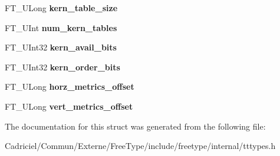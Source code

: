 \begin{DoxyCompactItemize}
\item 
\hypertarget{struct_t_t___face_rec___acfef0fabbe95af382fb0710edfe98887}{F\-T\-\_\-\-U\-Long {\bfseries kern\-\_\-table\-\_\-size}}\label{struct_t_t___face_rec___acfef0fabbe95af382fb0710edfe98887}

\item 
\hypertarget{struct_t_t___face_rec___a9c5b27564d0c22e0ee6edd7b6dc675c0}{F\-T\-\_\-\-U\-Int {\bfseries num\-\_\-kern\-\_\-tables}}\label{struct_t_t___face_rec___a9c5b27564d0c22e0ee6edd7b6dc675c0}

\item 
\hypertarget{struct_t_t___face_rec___a5f97232ee6773a57ef8734555cc960e1}{F\-T\-\_\-\-U\-Int32 {\bfseries kern\-\_\-avail\-\_\-bits}}\label{struct_t_t___face_rec___a5f97232ee6773a57ef8734555cc960e1}

\item 
\hypertarget{struct_t_t___face_rec___a810b4e002ebbdfcb44005cb69b09a917}{F\-T\-\_\-\-U\-Int32 {\bfseries kern\-\_\-order\-\_\-bits}}\label{struct_t_t___face_rec___a810b4e002ebbdfcb44005cb69b09a917}

\item 
\hypertarget{struct_t_t___face_rec___a5ff62c77d90743e333ca8dfa7d382f22}{F\-T\-\_\-\-U\-Long {\bfseries horz\-\_\-metrics\-\_\-offset}}\label{struct_t_t___face_rec___a5ff62c77d90743e333ca8dfa7d382f22}

\item 
\hypertarget{struct_t_t___face_rec___a33baf2e26d533d82f06875361fd423d1}{F\-T\-\_\-\-U\-Long {\bfseries vert\-\_\-metrics\-\_\-offset}}\label{struct_t_t___face_rec___a33baf2e26d533d82f06875361fd423d1}

\end{DoxyCompactItemize}


The documentation for this struct was generated from the following file\-:\begin{DoxyCompactItemize}
\item 
Cadriciel/\-Commun/\-Externe/\-Free\-Type/include/freetype/internal/tttypes.\-h\end{DoxyCompactItemize}
